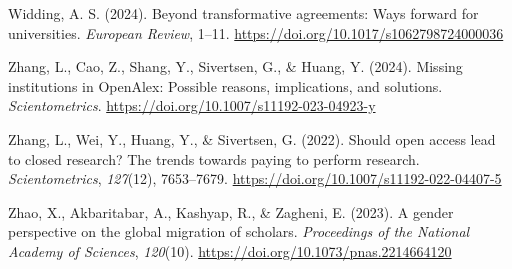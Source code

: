 \documentclass[a4paper,man,floatsintext,longtable,noextraspace,12pt]{apa6}
\newlength{\cslhangindent}
\newenvironment{CSLReferences}[2] %
  {\begin{list}{}{%
   \setlength{\itemindent}{0pt}
   \setlength{\leftmargin}{0pt}
   \setlength{\parsep}{0pt}
   \ifodd #1
    \setlength{\leftmargin}{\cslhangindent}
    \setlength{\itemindent}{-1\cslhangindent}
   \fi
   \setlength{\itemsep}{#2\baselineskip}}}
  {\end{list}}
\begin{document}
\begin{CSLReferences}{1}{0}
Widding, A. S. (2024). Beyond transformative agreements: Ways forward
for universities. \emph{European Review}, 1--11.
\url{https://doi.org/10.1017/s1062798724000036}

Zhang, L., Cao, Z., Shang, Y., Sivertsen, G., \& Huang, Y. (2024).
Missing institutions in OpenAlex: Possible reasons, implications, and
solutions. \emph{Scientometrics}.
\url{https://doi.org/10.1007/s11192-023-04923-y}

Zhang, L., Wei, Y., Huang, Y., \& Sivertsen, G. (2022). Should open
access lead to closed research? The trends towards paying to perform
research. \emph{Scientometrics}, \emph{127}(12), 7653--7679.
\url{https://doi.org/10.1007/s11192-022-04407-5}

Zhao, X., Akbaritabar, A., Kashyap, R., \& Zagheni, E. (2023). A gender
perspective on the global migration of scholars. \emph{Proceedings of
the National Academy of Sciences}, \emph{120}(10).
\url{https://doi.org/10.1073/pnas.2214664120}

\end{CSLReferences}
\end{document}
